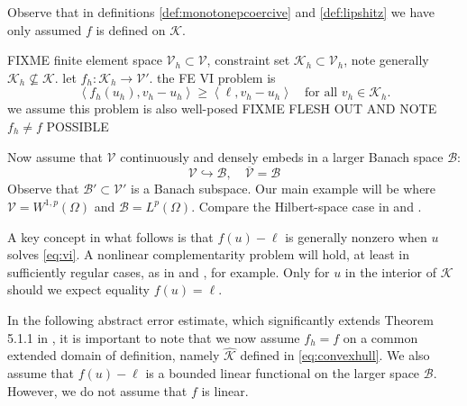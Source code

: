 \documentclass[hidelinks,onefignum,onetabnum,final]{siamart220329}  %
\newcommand{\cB}{\mathcal{B}}
\newcommand{\cK}{\mathcal{K}}
\newcommand{\cV}{\mathcal{V}}
\newcommand{\hcK}{\widehat{\cK}}
\newcommand{\ip}[2]{\left<#1,#2\right>}
\begin{document}
Observe that in definitions \ref{def:monotonepcoercive} and \ref{def:lipshitz} we have only assumed $f$ is defined on $\cK$.

FIXME finite element space $\cV_h \subset \cV$, constraint set $\cK_h\subset \cV_h$, note generally $\cK_h \nsubseteq \cK$.  let $f_h:\cK_h\to\cV'$.  the FE VI problem is
\begin{equation}
\ip{f_h(u_h)}{v_h-u_h} \ge \ip{\ell}{v_h-u_h} \quad \text{for all } v_h\in \cK_h. \label{eq:fe:vi}
\end{equation}
we assume this problem is also well-posed FIXME FLESH OUT AND NOTE $f_h\ne f$ POSSIBLE

Now assume that $\cV$ continuously and densely embeds in a larger Banach space $\cB$:
\begin{equation}
\cV \hookrightarrow \cB, \quad \overline{\cV} = \cB
\end{equation}
Observe that $\cB' \subset \cV'$ is a Banach subspace.  Our main example will be where $\cV=W^{1,p}(\Omega)$ and $\cB=L^p(\Omega)$.  Compare the Hilbert-space case in \cite{Falk1974} and \cite[section 5.1]{Ciarlet2002}.

A key concept in what follows is that $f(u)-\ell$ is generally nonzero when $u$ solves \eqref{eq:vi}.  A nonlinear complementarity problem will hold, at least in sufficiently regular cases, as in \cite[Exercise 5.1.1]{Ciarlet2002}  and \cite[section 7]{BuelerFarrell2024}, for example.  Only for $u$ in the interior of $\cK$ should we expect equality $f(u)=\ell$.

In the following abstract error estimate, which significantly extends Theorem 5.1.1 in \cite{Ciarlet2002}, it is important to note that we now assume $f_h=f$ on a common extended domain of definition, namely $\hcK$ defined in \eqref{eq:convexhull}.  We also assume that $f(u)-\ell$ is a bounded linear functional on the larger space $\cB$.  However, we do not assume that $f$ is linear.
\end{document}
